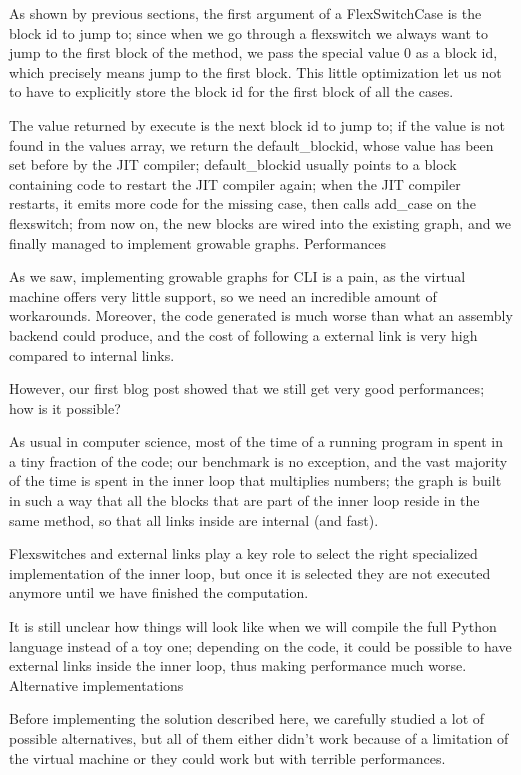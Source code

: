 {As shown by previous sections, the first argument of a FlexSwitchCase is the block id to jump to; since when we go through a flexswitch we always want to jump to the first block of the method, we pass the special value 0 as a block id, which precisely means jump to the first block. This little optimization let us not to have to explicitly store the block id for the first block of all the cases.

The value returned by execute is the next block id to jump to; if the value is not found in the values array, we return the default_blockid, whose value has been set before by the JIT compiler; default_blockid usually points to a block containing code to restart the JIT compiler again; when the JIT compiler restarts, it emits more code for the missing case, then calls add_case on the flexswitch; from now on, the new blocks are wired into the existing graph, and we finally managed to implement growable graphs.
Performances

As we saw, implementing growable graphs for CLI is a pain, as the virtual machine offers very little support, so we need an incredible amount of workarounds. Moreover, the code generated is much worse than what an assembly backend could produce, and the cost of following a external link is very high compared to internal links.

However, our first blog post showed that we still get very good performances; how is it possible?

As usual in computer science, most of the time of a running program in spent in a tiny fraction of the code; our benchmark is no exception, and the vast majority of the time is spent in the inner loop that multiplies numbers; the graph is built in such a way that all the blocks that are part of the inner loop reside in the same method, so that all links inside are internal (and fast).

Flexswitches and external links play a key role to select the right specialized implementation of the inner loop, but once it is selected they are not executed anymore until we have finished the computation.

It is still unclear how things will look like when we will compile the full Python language instead of a toy one; depending on the code, it could be possible to have external links inside the inner loop, thus making performance much worse.
Alternative implementations

Before implementing the solution described here, we carefully studied a lot of possible alternatives, but all of them either didn't work because of a limitation of the virtual machine or they could work but with terrible performances.

}
